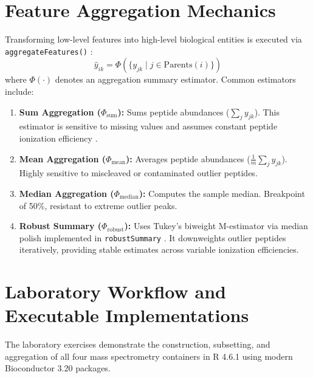 \documentclass[11pt,twoside,openright]{book}
\begin{document}
\section{Feature Aggregation Mechanics}
\label{sec:aggregation_mechanics}

Transforming low-level features into high-level biological entities is executed via \texttt{aggregateFeatures()} \cite{gatto2023qfeatures}:
\begin{equation}
\hat{y}_{ik} = \Phi\left( \{ y_{jk} \mid j \in \text{Parents}(i) \} \right)
\end{equation}
where $\Phi(\cdot)$ denotes an aggregation summary estimator. Common estimators include:
\begin{enumerate}
    \item \textbf{Sum Aggregation ($\Phi_{\text{sum}}$):} Sums peptide abundances ($\sum_j y_{jk}$). This estimator is sensitive to missing values and assumes constant peptide ionization efficiency \cite{cox2014maxquant}.
    \item \textbf{Mean Aggregation ($\Phi_{\text{mean}}$):} Averages peptide abundances ($\frac{1}{m} \sum_j y_{jk}$). Highly sensitive to miscleaved or contaminated outlier peptides.
    \item \textbf{Median Aggregation ($\Phi_{\text{median}}$):} Computes the sample median. Breakpoint of 50\%, resistant to extreme outlier peaks.
    \item \textbf{Robust Summary ($\Phi_{\text{robust}}$):} Uses Tukey's biweight M-estimator \cite{tukey1977exploratory} via median polish implemented in \texttt{robustSummary} \cite{goeminne2016msqrob}. It downweights outlier peptides iteratively, providing stable estimates across variable ionization efficiencies.
\end{enumerate}

\section{Laboratory Workflow and Executable Implementations}
\label{sec:lab_implementation}

The laboratory exercises demonstrate the construction, subsetting, and aggregation of all four mass spectrometry containers in R 4.6.1 using modern Bioconductor 3.20 packages.
\end{document}
